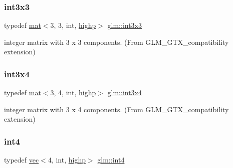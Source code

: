 \subsubsection{\texorpdfstring{int3x3}{int3x3}}
{\footnotesize\ttfamily typedef \mbox{\hyperlink{structglm_1_1mat}{mat}}$<$3, 3, int, \mbox{\hyperlink{namespaceglm_a36ed105b07c7746804d7fdc7cc90ff25ac6f7eab42eacbb10d59a58e95e362074}{highp}}$>$ \mbox{\hyperlink{group__gtx__compatibility_gac7c574e682731013783283d875602224}{glm\+::int3x3}}}



integer matrix with 3 x 3 components. (From G\+L\+M\+\_\+\+G\+T\+X\+\_\+compatibility extension) 

\mbox{\label{group__gtx__compatibility_gaaf72af875fd64f43606aa083d2374195}} 
\subsubsection{\texorpdfstring{int3x4}{int3x4}}
{\footnotesize\ttfamily typedef \mbox{\hyperlink{structglm_1_1mat}{mat}}$<$3, 4, int, \mbox{\hyperlink{namespaceglm_a36ed105b07c7746804d7fdc7cc90ff25ac6f7eab42eacbb10d59a58e95e362074}{highp}}$>$ \mbox{\hyperlink{group__gtx__compatibility_gaaf72af875fd64f43606aa083d2374195}{glm\+::int3x4}}}



integer matrix with 3 x 4 components. (From G\+L\+M\+\_\+\+G\+T\+X\+\_\+compatibility extension) 

\mbox{\label{group__gtx__compatibility_ga19f0c43f626567ad3ca888b8ad0d0093}} 
\subsubsection{\texorpdfstring{int4}{int4}}
{\footnotesize\ttfamily typedef \mbox{\hyperlink{structglm_1_1vec}{vec}}$<$4, int, \mbox{\hyperlink{namespaceglm_a36ed105b07c7746804d7fdc7cc90ff25ac6f7eab42eacbb10d59a58e95e362074}{highp}}$>$ \mbox{\hyperlink{group__gtx__compatibility_ga19f0c43f626567ad3ca888b8ad0d0093}{glm\+::int4}}}



